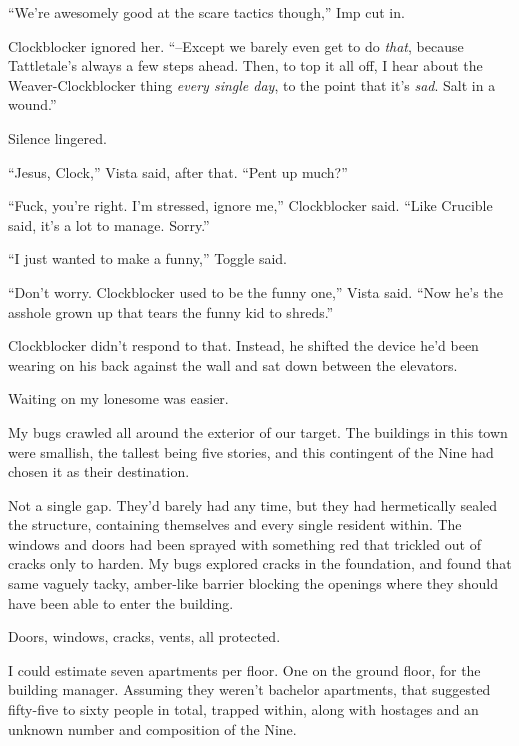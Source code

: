 ``We're awesomely good at the scare tactics though,'' Imp cut in.



Clockblocker ignored her.  ``--Except we barely even get to do \emph{that}, because Tattletale's always a few steps ahead.  Then, to top it all off, I hear about the Weaver-Clockblocker thing \emph{every single day}, to the point that it's \emph{sad}.  Salt in a wound.''



Silence lingered.



``Jesus, Clock,'' Vista said, after that.  ``Pent up much?''



``Fuck, you're right.  I'm stressed, ignore me,'' Clockblocker said.  ``Like Crucible said, it's a lot to manage.  Sorry.''



``I just wanted to make a funny,'' Toggle said.



``Don't worry.  Clockblocker used to be the funny one,'' Vista said.  ``Now he's the asshole grown up that tears the funny kid to shreds.''



Clockblocker didn't respond to that.  Instead, he shifted the device he'd been wearing on his back against the wall and sat down between the elevators.



Waiting on my lonesome was easier.



My bugs crawled all around the exterior of our target.  The buildings in this town were smallish, the tallest being five stories, and this contingent of the Nine had chosen it as their destination.



Not a single gap.  They'd barely had any time, but they had hermetically sealed the structure, containing themselves and every single resident within.  The windows and doors had been sprayed with something red that trickled out of cracks only to harden.  My bugs explored cracks in the foundation, and found that same vaguely tacky, amber-like barrier blocking the openings where they should have been able to enter the building.



Doors, windows, cracks, vents, all protected.



I could estimate seven apartments per floor.  One on the ground floor, for the building manager.  Assuming they weren't bachelor apartments, that suggested fifty-five to sixty people in total, trapped within, along with hostages and an unknown number and composition of the Nine.



